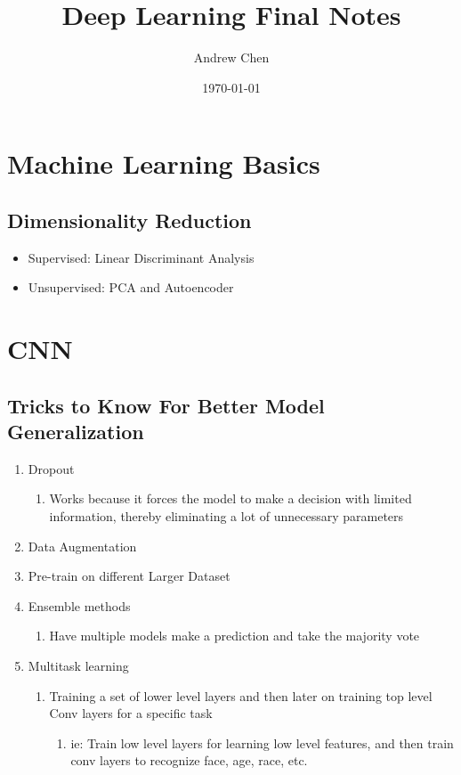 \documentclass[11pt]{article}
\author{Andrew Chen}
\date{\today}
\title{Deep Learning Final Notes}
\begin{document}
\maketitle


\section{Machine Learning Basics}
\label{sec:orgf27ab05}

\subsection{Dimensionality Reduction}
\label{sec:orgc33b697}
\begin{itemize}
\item Supervised: Linear Discriminant Analysis
\item Unsupervised: PCA and Autoencoder
\end{itemize}

\section{CNN}
\label{sec:orgcfaeff9}

\subsection{Tricks to Know For Better Model Generalization}
\label{sec:org7f65c36}

\begin{enumerate}
\item Dropout
\begin{enumerate}
\item Works because it forces the model to make a decision with limited information, thereby eliminating a lot of unnecessary parameters
\end{enumerate}
\item Data Augmentation
\item Pre-train on different Larger Dataset
\item Ensemble methods
\begin{enumerate}
\item Have multiple models make a prediction and take the majority vote
\end{enumerate}
\item Multitask learning
\begin{enumerate}
\item Training a set of lower level layers and then later on training top level Conv layers for a specific task
\begin{enumerate}
\item ie: Train low level layers for learning low level features, and then train conv layers to recognize face, age, race, etc.
\end{enumerate}
\end{enumerate}
\end{enumerate}
\end{document}
